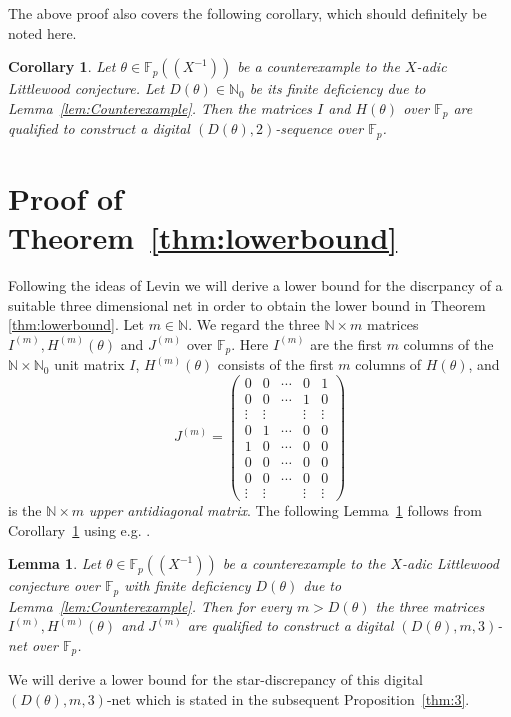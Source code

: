 \documentclass{article}
\newcommand{\NN}{\mathbb N}
\newcommand{\FF}{\mathbb{F}}
\renewcommand{\(}{\left (}
\renewcommand{\)}{\right )}
\newtheorem{lemma}[theorem]{Lemma}
\newtheorem{coro}[theorem]{Corollary}
\theoremstyle{definition}
\numberwithin{equation}{section}
\begin{document}
The above proof also covers the following corollary, which should definitely be noted here.  

\begin{coro}\label{coro:1}
	Let $\theta\in\FF_p((X^{-1}))$ be a counterexample to the $X$-adic Littlewood conjecture. Let $D(\theta)\in\NN_0$ be its finite deficiency due to Lemma~\ref{lem:Counterexample}. Then the matrices $I$ and $H(\theta)$ over $\FF_p$ are qualified to construct a digital $(D(\theta),2)$-sequence over $\FF_p$. 
	\end{coro}



\section{Proof of Theorem~\ref{thm:lowerbound}}\label{sec:3}

Following the ideas of Levin \cite{Levints1} we will derive a lower bound for the discrpancy of a suitable three dimensional net in order to obtain the lower bound in Theorem \ref{thm:lowerbound}. 
Let $m\in\NN$. We regard the three $\NN\times m$ matrices $I^{(m)},H^{(m)}(\theta)$ and $J^{(m)}$ over $\FF_p$. Here $I^{(m)}$ are the first $m$ columns of the $\NN \times \NN_0 $ unit matrix $I$, $H^{(m)}(\theta)$ consists of the first $m$ columns of $H(\theta)$, and $$J^{(m)}=\begin{pmatrix}
0&0&\cdots&0&1\\
0&0&\cdots&1&0\\
\vdots&\vdots&&\vdots&\vdots\\
0&1&\cdots&0&0 \\
1&0&\cdots&0&0 \\
0&0&\cdots&0&0\\
0&0&\cdots&0&0\\
\vdots&\vdots&&\vdots&\vdots
\end{pmatrix} $$ is the $\NN\times m$ \emph{upper antidiagonal matrix}. 
The following Lemma~\ref{lem:1} follows from Corollary~\ref{coro:1} using e.g. \cite[Lemma~4.38]{DP}. 
\begin{lemma}\label{lem:1}
Let $\theta\in\FF_p((X^{-1}))$ be a counterexample to the $X$-adic Littlewood conjecture over $\FF_p$ with finite deficiency $D(\theta)$ due to Lemma~\ref{lem:Counterexample}. Then for every $m>D(\theta)$ the three matrices $I^{(m)},H^{(m)}(\theta)$ and $J^{(m)}$ are qualified to construct a digital $(D(\theta),m,3)$-net over $\FF_p$. 
\end{lemma}

We will derive a lower bound for the star-discrepancy of this digital $(D(\theta),m,3)$-net which is stated in the subsequent Proposition~\ref{thm:3}. %
\end{document}
